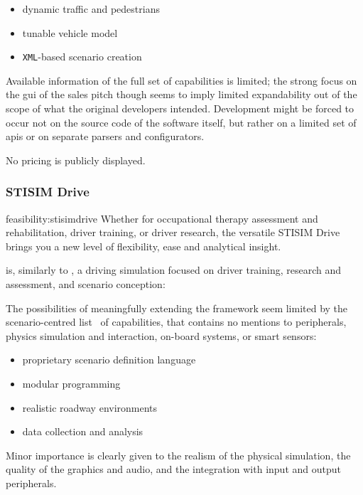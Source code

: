 \begin{itemize}
	\item dynamic traffic and pedestrians
    \item tunable vehicle model
    \item \texttt{XML}-based scenario creation
\end{itemize}

Available information of the full set of capabilities is limited; the strong focus on the \gls{gui} of the sales pitch though seems to imply limited expandability out of the scope of what the original developers intended. Development might be forced to occur not on the source code of the software itself, but rather on a limited set of \glspl{api} or on separate parsers and configurators.

No pricing is publicly displayed.

\subsubsection{STISIM Drive}

\begin{excerpt}{feasibility:stisimdrive}
Whether for occupational therapy assessment and rehabilitation, driver training, or driver research, the versatile STISIM Drive brings you a new level of flexibility, ease and analytical insight.
\end{excerpt}

 is, similarly to , a driving simulation focused on driver training, research and assessment, and scenario conception:

The possibilities of meaningfully extending the \gls{framework} seem limited by the scenario-centred list~\cite{feasibility:stisimdrivefeatures} of capabilities, that contains no mentions to peripherals, physics simulation and interaction, on-board systems, or smart sensors:

\begin{itemize}
	\item proprietary scenario definition language
    \item modular programming
    \item realistic roadway environments
    \item data collection and analysis
\end{itemize}

Minor importance is clearly given to the realism of the physical simulation, the quality of the graphics and audio, and the integration with input and output peripherals.

